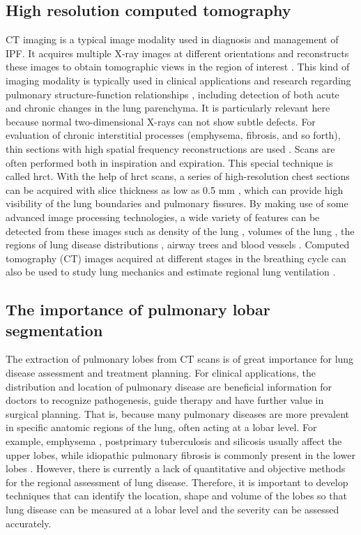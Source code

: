 \subsection{High resolution computed tomography}
CT imaging is a typical image modality used in diagnosis and management of IPF. It acquires multiple X-ray images at different orientations and reconstructs these images to obtain tomographic views in the region of interest \citep{zhang2011medical}. This kind of imaging modality is typically used in clinical applications and research regarding pulmonary structure-function relationships \citep{hoffman1997assessment}, including detection of both acute and chronic changes in the lung parenchyma. It is particularly relevant here because normal two-dimensional X-rays can not show subtle  defects. For evaluation of chronic interstitial processes (emphysema, fibrosis, and so forth), thin sections with high spatial frequency reconstructions are used \citep{coxson2007computed}. Scans are often performed both in inspiration and expiration. This special technique is called \gls{hrct}. With the help of \gls{hrct} scans, a series of high-resolution chest sections can be acquired with slice thickness as low as 0.5 mm \citep{naidich2005imaging}, which can provide high visibility of the lung boundaries and pulmonary fissures.  By making use of some advanced image processing technologies, a wide variety of features can be detected from these images such as density of the lung \citep{coxson2007computed}, volumes of the lung \citep{hu2001automatic}, the regions of lung disease distributions \citep{el2013computer, ley2008quantitative}, airway trees \citep{graham2010robust, zhu2010automatic, diaz2010airway} and blood vessels \citep{shikata2009segmentation}. Computed tomography (CT) images acquired at different stages in the breathing cycle can also be used to study lung mechanics and estimate regional lung ventilation \citep{hoffman2006state, yamamoto2011investigation}.

\subsection{The importance of pulmonary lobar segmentation}
The extraction of pulmonary lobes from CT scans is of great importance for lung disease assessment and treatment planning. For clinical applications, the distribution and location of pulmonary disease are beneficial information for doctors to recognize pathogenesis, guide therapy and have further value in surgical planning. That is, because many pulmonary diseases are more prevalent in specific anatomic regions of the lung, often acting at a lobar level. For example, emphysema \citep{jeffery1998structural}, postprimary tuberculosis \citep{leung1999pulmonary} and silicosis \citep{rees2007silica} usually affect the upper lobes, while idiopathic pulmonary fibrosis is commonly present in the lower lobes \citep{lin2015combined}. However, there is currently a lack of quantitative and objective methods for the regional assessment of lung disease. Therefore, it is important to develop techniques that can identify the location, shape and volume of the lobes so that lung disease can be measured at a lobar level and the severity can be assessed accurately.

